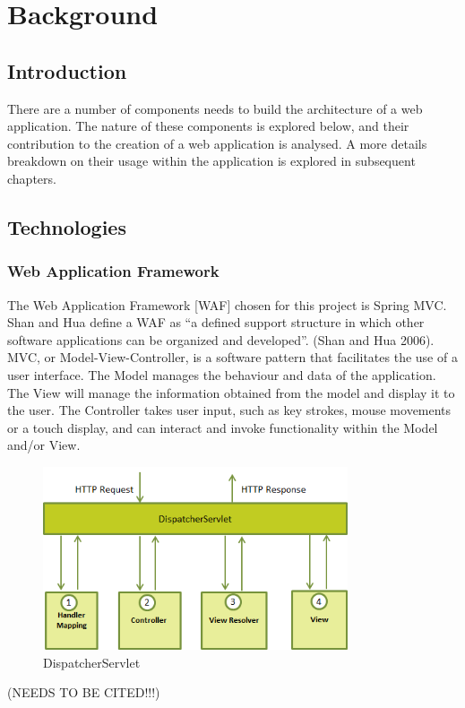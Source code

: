 \chapter{Background}
\label{background}

\section{Introduction}

There are a number of components needs to build the architecture of a web application. The nature of these components is explored below, and their contribution to the creation of a web application is analysed. A more details breakdown on their usage within the application is explored in subsequent chapters.

\section{Technologies}

\subsection{Web Application Framework}
The Web Application Framework [WAF] chosen for this project is Spring MVC. Shan and Hua define a WAF as “a defined support structure in which other software applications can be organized and developed”. (Shan and Hua 2006). MVC, or Model-View-Controller, is a software pattern that facilitates the use of a user interface. The Model manages the behaviour and data of the application. The View will manage the information obtained from the model and display it to the user. The Controller takes user input, such as key strokes, mouse movements or a touch display, and can interact and invoke functionality within the Model and/or View.

\begin{figure}[H]
\begin{center}
\includegraphics[width=9cm]{dispatchservlet.png}
\end{center}
\caption{DispatcherServlet }
\label{fig:dispatcherflow}
\end{figure}
(NEEDS TO BE CITED!!!)

